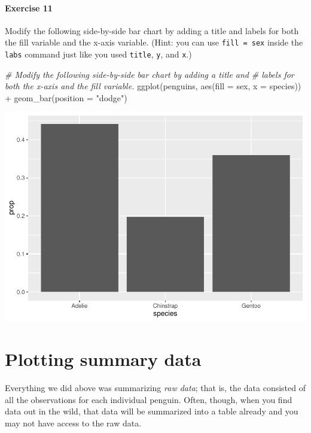 \documentclass[
]{book}
\newenvironment{Shaded}{\begin{snugshade}}{\end{snugshade}}
\newcommand{\AttributeTok}[1]{\textcolor[rgb]{0.77,0.63,0.00}{#1}}
\newcommand{\CommentTok}[1]{\textcolor[rgb]{0.56,0.35,0.01}{\textit{#1}}}
\newcommand{\FunctionTok}[1]{\textcolor[rgb]{0.00,0.00,0.00}{#1}}
\newcommand{\NormalTok}[1]{#1}
\newcommand{\SpecialCharTok}[1]{\textcolor[rgb]{0.00,0.00,0.00}{#1}}
\newcommand{\StringTok}[1]{\textcolor[rgb]{0.31,0.60,0.02}{#1}}
\begin{document}
\hypertarget{exercise-11}{%
\paragraph*{Exercise 11}\label{exercise-11}}

Modify the following side-by-side bar chart by adding a title and labels for both the fill variable and the x-axis variable. (Hint: you can use \texttt{fill\ =\ sex} inside the \texttt{labs} command just like you used \texttt{title}, \texttt{y}, and \texttt{x}.)

\begin{Shaded}
\begin{Highlighting}[]
\CommentTok{\# Modify the following side{-}by{-}side bar chart by adding a title and }
\CommentTok{\# labels for both the x{-}axis and the fill variable.}
\FunctionTok{ggplot}\NormalTok{(penguins, }\FunctionTok{aes}\NormalTok{(}\AttributeTok{fill =}\NormalTok{ sex, }\AttributeTok{x =}\NormalTok{ species)) }\SpecialCharTok{+}
    \FunctionTok{geom\_bar}\NormalTok{(}\AttributeTok{position =} \StringTok{"dodge"}\NormalTok{)}
\end{Highlighting}
\end{Shaded}

\includegraphics{intro_stats_files/figure-latex/unnamed-chunk-70-1.pdf}

\hypertarget{categorical-summary}{%
\section{Plotting summary data}\label{categorical-summary}}

Everything we did above was summarizing \emph{raw data}; that is, the data consisted of all the observations for each individual penguin. Often, though, when you find data out in the wild, that data will be summarized into a table already and you may not have access to the raw data.
\end{document}
